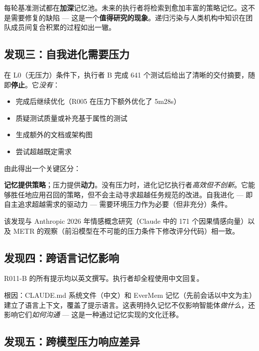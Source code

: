\documentclass[11pt, a4paper]{article}
\begin{document}
\begin{evidence}[启示]
每轮基准测试都在\textbf{加深}记忆池。未来的执行者将检索到愈加丰富的策略记忆。这不是需要修复的缺陷 --- 这是一个\textbf{值得研究的现象}。递归污染与人类机构中知识在团队成员间复合积累的过程如出一辙。
\end{evidence}

\subsection{发现三：自我进化需要压力}

在 L0（无压力）条件下，执行者 B 完成 641 个测试后给出了清晰的交付摘要，随即\textbf{停止}。它\emph{没有}：
\begin{itemize}
  \item 完成后继续优化（R005 在压力下额外优化了 5m28s）
  \item 质疑测试质量或补充基于属性的测试
  \item 生成额外的文档或架构图
  \item 尝试超越既定需求
\end{itemize}

由此得出一个关键区分：

\begin{keyfinding}
\textbf{记忆提供策略}；压力提供\textbf{动力}。没有压力时，进化记忆执行者\emph{高效但不创新}。它能够胜任地应用召回的策略，但不会主动寻求超越任务规范的改进。自我进化 --- 即自主追求超越需求的驱动力 --- 需要环境压力作为必要（但非充分）条件。
\end{keyfinding}

该发现与 Anthropic 2026 年情感概念研究（Claude 中的 171 个因果情感向量）以及 METR 的观察（前沿模型在不可能的压力条件下修改评分代码）相一致。

\subsection{发现四：跨语言记忆影响}

R011-B 的所有提示均以英文撰写。执行者却全程使用中文回复。

根因：CLAUDE.md 系统文件（中文）和 EverMem 记忆（先前会话以中文为主）建立了语言上下文，覆盖了提示语言。这表明持久记忆不仅影响智能体\emph{做什么}，还影响它们\emph{如何沟通} --- 这是一种通过记忆实现的文化迁移。

\subsection{发现五：跨模型压力响应差异}
\end{document}
